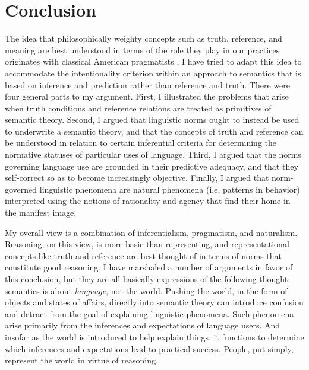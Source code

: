 \section{Conclusion}

The idea that philosophically weighty concepts such as truth, reference, and meaning are best understood in terms of the role they play in our practices originates with classical American pragmatists \citep{Misak:2013,Misak:2007,Peirce:1992,Brandom:2011}. I have tried to adapt this idea to accommodate the intentionality criterion within an approach to semantics that is based on inference and prediction rather than reference and truth. There were four general parts to my argument. First, I illustrated the problems that arise when truth conditions and reference relations are treated as primitives of semantic theory. Second, I argued that linguistic norms ought to instead be used to underwrite a semantic theory, and that the concepts of truth and reference can be understood in relation to certain inferential criteria for determining the normative statuses of particular uses of language. Third, I argued that the norms governing language use are grounded in their predictive adequacy, and that they self-correct so as to become increasingly objective. Finally, I argued that norm-governed linguistic phenomena are natural phenomena (i.e. patterns in behavior) interpreted using the notions of rationality and agency that find their home in the manifest image.

My overall view is a combination of inferentialism, pragmatism, and naturalism. Reasoning, on this view, is more basic than representing, and representational concepts like truth and reference are best thought of in terms of norms that constitute good reasoning. I have marshaled a number of arguments in favor of this conclusion, but they are all basically expressions of the following thought: semantics is about \textit{language}, not the world. Pushing the world, in the form of objects and states of affairs, directly into semantic theory can introduce confusion and detract from the goal of explaining linguistic phenomena. Such phenomena arise primarily from the inferences and expectations of language users. And insofar as the world is introduced to help explain things, it functions to determine which inferences and expectations lead to practical success. People, put simply, represent the world in virtue of reasoning.
